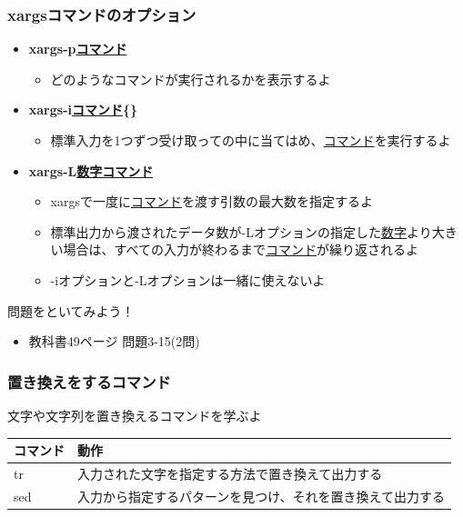 \documentclass[slide03.tex]{subfiles}
\begin{document}
\begin{frame}
    \frametitle{xargsコマンドのオプション}
    \begin{itemize}
        \item {\bf xargs\textvisiblespace -p\textvisiblespace\underline{コマンド}}
        \begin{itemize}
            \small
            \item どのようなコマンドが実行されるかを表示するよ
        \end{itemize}
        \item {\bf xargs\textvisiblespace -i\textvisiblespace\underline{コマンド}\textvisiblespace\{\}}
        \begin{itemize}
            \small
            \item 標準入力を1つずつ受け取って{}の中に当てはめ、\underline{コマンド}を実行するよ
        \end{itemize}
        \item {\bf xargs\textvisiblespace -L\textvisiblespace\underline{数字}\textvisiblespace\underline{コマンド}}
        \begin{itemize}
            \small
            \item xargsで一度に\underline{コマンド}を渡す引数の最大数を指定するよ
            \item 標準出力から渡されたデータ数が-Lオプションの指定した\underline{数字}より大きい場合は、すべての入力が終わるまで\underline{コマンド}が繰り返されるよ
            \item -iオプションと-Lオプションは一緒に使えないよ
        \end{itemize}
    \end{itemize}
\end{frame}

\begin{frame}
    \begin{exampleblock}{問題をといてみよう！}
        \begin{itemize}
            \item 教科書49ページ 問題3-15(2問)
        \end{itemize}
    \end{exampleblock}
\end{frame}

\begin{frame}
    \frametitle{置き換えをするコマンド}
    文字や文字列を置き換えるコマンドを学ぶよ\\
    \vspace{\zh}
    \begin{tabular}{lp{}}
        コマンド & 動作                                                       \\ \hline
        tr       & 入力された文字を指定する方法で置き換えて出力する           \\
        sed      & 入力から指定するパターンを見つけ、それを置き換えて出力する \\ \hline
    \end{tabular}
\end{frame}
\end{document}
